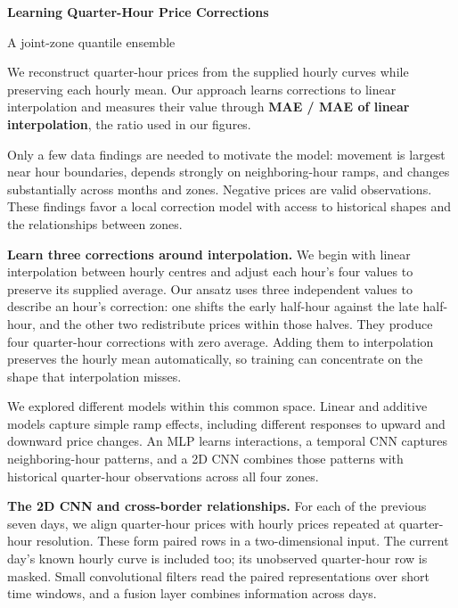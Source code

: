 \documentclass[11pt,a4paper]{article}
\newcommand{\reportsection}[2]{\vspace{5pt}{\large\bfseries\color{ink}#1\enspace #2}\par\vspace{2pt}}
\newcommand{\runin}[1]{\textbf{#1}\enspace}
\begin{document}
{\LARGE\bfseries\color{ink}Learning Quarter-Hour Price Corrections\par}
\vspace{4pt}
{\large A joint-zone quantile ensemble\par}
\vspace{6pt}

We reconstruct quarter-hour prices from the supplied hourly curves while
preserving each hourly mean. Our approach learns corrections to linear
interpolation and measures their value through \textbf{MAE / MAE of linear
interpolation}, the ratio used in our figures.

Only a few data findings are needed to motivate the model: movement is largest
near hour boundaries, depends strongly on neighboring-hour ramps, and changes
substantially across months and zones. Negative prices are valid observations.
These findings favor a local correction model with access to historical
shapes and the relationships between zones.

\reportsection{1}{Our ansatz space}

\runin{Learn three corrections around interpolation.}
We begin with linear interpolation between hourly centres and adjust each
hour's four values to preserve its supplied average. Our ansatz uses three
independent values to describe an hour's correction: one shifts the early
half-hour against the late half-hour, and the other two redistribute prices
within those halves. They produce four quarter-hour corrections with zero
average. Adding them to interpolation preserves the hourly mean automatically,
so training can concentrate on the shape that interpolation misses.

We explored different models within this common space. Linear and additive
models capture simple ramp effects, including different responses to upward
and downward price changes. An MLP learns interactions, a temporal CNN captures
neighboring-hour patterns, and a 2D CNN combines those patterns with historical
quarter-hour observations across all four zones.

\runin{The 2D CNN and cross-border relationships.}
For each of the previous seven days, we align quarter-hour prices with hourly
prices repeated at quarter-hour resolution. These form paired rows in a
two-dimensional input. The current day's known hourly curve is included too;
its unobserved quarter-hour row is masked. Small convolutional filters read
the paired representations over short time windows, and a fusion layer
combines information across days.
\end{document}
